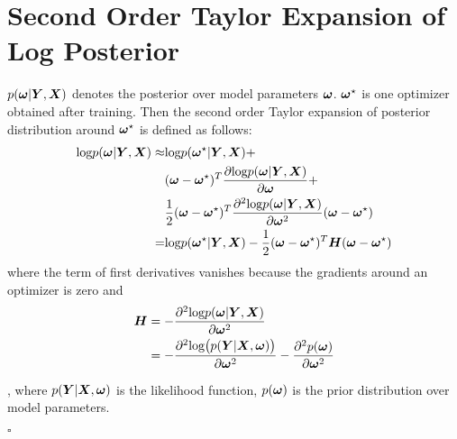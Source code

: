 \section{Second Order Taylor Expansion of Log Posterior}\label{d_second_Hessian}
$p(\boldsymbol \omega| \boldsymbol Y, \boldsymbol X)$ denotes the posterior over model parameters $\boldsymbol \omega$. $\boldsymbol \omega^\star$ is one optimizer obtained after training. Then the second order Taylor expansion of posterior distribution around $\boldsymbol \omega^\star$ is defined as follows:
 \begin{equation}
\begin{aligned} 
\text{log} p(\boldsymbol \omega| \boldsymbol Y, \boldsymbol X) \approx & 
\text{log}p(\boldsymbol \omega^\star|\boldsymbol Y, \boldsymbol X) + \\
&(\boldsymbol \omega - \boldsymbol \omega^\star)^T\frac{\partial \text{log} p(\boldsymbol \omega| \boldsymbol Y, \boldsymbol X)}{\partial \boldsymbol \omega} + \\
&\frac{1}{2}(\boldsymbol \omega - \boldsymbol \omega^\star)^T\frac{\partial^2\text{log} p(\boldsymbol \omega |\boldsymbol Y, \boldsymbol X)}{\partial \boldsymbol \omega^2}(\boldsymbol \omega - \boldsymbol \omega^\star)\\
= &\text{log}p(\boldsymbol \omega^\star|\boldsymbol Y, \boldsymbol X) - \frac{1}{2}(\boldsymbol \omega - \boldsymbol \omega^\star)^T\boldsymbol H(\boldsymbol \omega - \boldsymbol \omega^\star)
\end{aligned}
\end{equation}
where the term of first derivatives vanishes because the gradients around an optimizer is zero and 
\[
\begin{aligned}
\boldsymbol H &= -\frac{\partial^2\text{log} p(\boldsymbol \omega|\boldsymbol Y, \boldsymbol X)}{\partial \boldsymbol \omega^2}\\
&=-\frac{\partial^2\text{log}\big(p(\boldsymbol Y|\boldsymbol X, \boldsymbol \omega)\big)}{\partial \boldsymbol \omega^2} - \frac{\partial^2p(\boldsymbol \omega)}{\partial\boldsymbol \omega^2}
\end{aligned}
\]

, where $p(\boldsymbol Y | \boldsymbol X, \boldsymbol \omega)$ is the likelihood function, $p(\boldsymbol \omega)$ is the prior distribution over model parameters.
 \begin{flushright}
	$\square$
\end{flushright}


